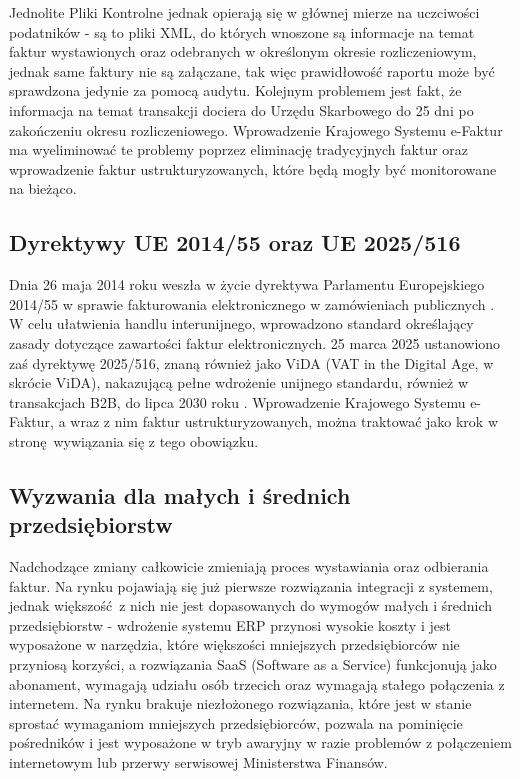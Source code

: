 Jednolite Pliki Kontrolne jednak opierają się w głównej mierze na uczciwości podatników - są to pliki XML, do których wnoszone są informacje na temat faktur wystawionych oraz odebranych w określonym okresie rozliczeniowym, jednak same faktury nie są załączane, tak więc prawidłowość raportu może być sprawdzona jedynie za pomocą audytu. Kolejnym problemem jest fakt, że informacja na temat transakcji dociera do Urzędu Skarbowego do 25 dni \parencite{zebrowska-fresenbet_jpk_2021} po zakończeniu okresu rozliczeniowego. Wprowadzenie Krajowego Systemu e-Faktur ma wyeliminować te problemy poprzez eliminację tradycyjnych faktur oraz wprowadzenie faktur ustrukturyzowanych, które będą mogły być monitorowane na bieżąco. 

\subsection{Dyrektywy UE 2014/55 oraz UE 2025/516}
Dnia 26 maja 2014 roku weszła w życie dyrektywa Parlamentu Europejskiego 2014/55 w sprawie fakturowania elektronicznego w zamówieniach publicznych \parencite{european_directive_2014}. W celu ułatwienia handlu interunijnego, wprowadzono standard określający zasady dotyczące zawartości faktur elektronicznych. 25 marca 2025 ustanowiono zaś dyrektywę 2025/516, znaną również jako ViDA (VAT in the Digital Age, w skrócie ViDA), nakazującą pełne wdrożenie unijnego standardu, również w transakcjach B2B, do lipca 2030 roku \parencite{vida_council_2025}. Wprowadzenie Krajowego Systemu e-Faktur, a wraz z nim faktur ustrukturyzowanych, można traktować jako krok w stronę wywiązania się z tego obowiązku.

\subsection{Wyzwania dla małych i średnich przedsiębiorstw}
Nadchodzące zmiany całkowicie zmieniają proces wystawiania oraz odbierania faktur. Na rynku pojawiają się już pierwsze rozwiązania integracji z systemem, jednak większość z nich nie jest dopasowanych do wymogów małych i średnich przedsiębiorstw - wdrożenie systemu ERP przynosi wysokie koszty i jest wyposażone w narzędzia, które większości mniejszych przedsiębiorców nie przyniosą korzyści, a rozwiązania SaaS (Software as a Service) funkcjonują jako abonament, wymagają udziału osób trzecich oraz wymagają stałego połączenia z internetem. Na rynku brakuje niezłożonego rozwiązania, które jest w stanie sprostać wymaganiom mniejszych przedsiębiorców, pozwala na pominięcie pośredników i jest wyposażone w tryb awaryjny w razie problemów z połączeniem internetowym lub przerwy serwisowej Ministerstwa Finansów.

